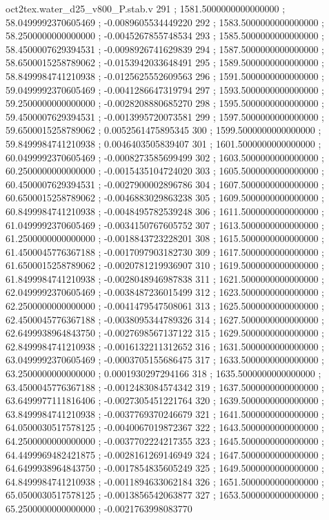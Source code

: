 \begin{filecontents}[overwrite]{oct2tex.water_d25_v800_P.stab.v}
291 ; 1581.5000000000000000 ; 58.0499992370605469 ; -0.0089605534449220
292 ; 1583.5000000000000000 ; 58.2500000000000000 ; -0.0045267855748534
293 ; 1585.5000000000000000 ; 58.4500007629394531 ; -0.0098926741629839
294 ; 1587.5000000000000000 ; 58.6500015258789062 ; -0.0153942033648491
295 ; 1589.5000000000000000 ; 58.8499984741210938 ; -0.0125625552609563
296 ; 1591.5000000000000000 ; 59.0499992370605469 ; -0.0041286647319794
297 ; 1593.5000000000000000 ; 59.2500000000000000 ; -0.0028208880685270
298 ; 1595.5000000000000000 ; 59.4500007629394531 ; -0.0013995720073581
299 ; 1597.5000000000000000 ; 59.6500015258789062 ; 0.0052561475895345
300 ; 1599.5000000000000000 ; 59.8499984741210938 ; 0.0046403505839407
301 ; 1601.5000000000000000 ; 60.0499992370605469 ; -0.0008273585699499
302 ; 1603.5000000000000000 ; 60.2500000000000000 ; -0.0015435104724020
303 ; 1605.5000000000000000 ; 60.4500007629394531 ; -0.0027900002896786
304 ; 1607.5000000000000000 ; 60.6500015258789062 ; -0.0046883029863238
305 ; 1609.5000000000000000 ; 60.8499984741210938 ; -0.0048495782539248
306 ; 1611.5000000000000000 ; 61.0499992370605469 ; -0.0034150767605752
307 ; 1613.5000000000000000 ; 61.2500000000000000 ; -0.0018843723228201
308 ; 1615.5000000000000000 ; 61.4500045776367188 ; -0.0017097903182730
309 ; 1617.5000000000000000 ; 61.6500015258789062 ; -0.0020781219936907
310 ; 1619.5000000000000000 ; 61.8499984741210938 ; -0.0028048946987838
311 ; 1621.5000000000000000 ; 62.0499992370605469 ; -0.0038487236015499
312 ; 1623.5000000000000000 ; 62.2500000000000000 ; -0.0041479547508061
313 ; 1625.5000000000000000 ; 62.4500045776367188 ; -0.0038095344789326
314 ; 1627.5000000000000000 ; 62.6499938964843750 ; -0.0027698567137122
315 ; 1629.5000000000000000 ; 62.8499984741210938 ; -0.0016132211312652
316 ; 1631.5000000000000000 ; 63.0499992370605469 ; -0.0003705155686475
317 ; 1633.5000000000000000 ; 63.2500000000000000 ; 0.0001930297294166
318 ; 1635.5000000000000000 ; 63.4500045776367188 ; -0.0012483084574342
319 ; 1637.5000000000000000 ; 63.6499977111816406 ; -0.0027305451221764
320 ; 1639.5000000000000000 ; 63.8499984741210938 ; -0.0037769370246679
321 ; 1641.5000000000000000 ; 64.0500030517578125 ; -0.0040067019872367
322 ; 1643.5000000000000000 ; 64.2500000000000000 ; -0.0037702224217355
323 ; 1645.5000000000000000 ; 64.4499969482421875 ; -0.0028161269146949
324 ; 1647.5000000000000000 ; 64.6499938964843750 ; -0.0017854835605249
325 ; 1649.5000000000000000 ; 64.8499984741210938 ; -0.0011894633062184
326 ; 1651.5000000000000000 ; 65.0500030517578125 ; -0.0013856542063877
327 ; 1653.5000000000000000 ; 65.2500000000000000 ; -0.0021763998083770

\end{filecontents}
